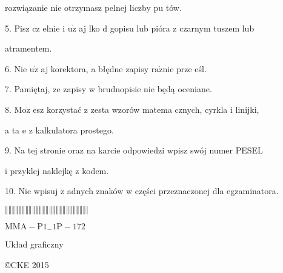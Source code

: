 \documentclass[a4paper,12pt]{article}
\begin{document}
rozwiązanie nie otrzymasz pelnej liczby pu tów.

5. Pisz cz elnie i $\mathrm{u}\dot{\mathrm{z}}$ aj lko $\mathrm{d}$ gopisu lub pióra z czarnym tuszem lub

atramentem.

6. Nie $\mathrm{u}\dot{\mathrm{z}}$ aj korektora, a błędne zapisy $\mathrm{r}\mathrm{a}\acute{\mathrm{z}}\mathrm{n}\mathrm{i}\mathrm{e}$ prze eśl.

7. Pamiętaj, $\dot{\mathrm{z}}\mathrm{e}$ zapisy w brudnopisie nie będą oceniane.

8. $\mathrm{M}\mathrm{o}\dot{\mathrm{z}}$ esz korzystać z zesta wzorów matema cznych, cyrkla i linijki,

a ta $\mathrm{e}$ z kalkulatora prostego.

9. Na tej stronie oraz na karcie odpowiedzi wpisz swój numer PESEL

i przyklej naklejkę z kodem.

10. Nie wpisuj $\dot{\mathrm{z}}$ adnych znaków w części przeznaczonej dla egzaminatora.

$\Vert\Vert\Vert\Vert\Vert\Vert\Vert\Vert\Vert\Vert\Vert\Vert\Vert\Vert\Vert\Vert\Vert\Vert\Vert\Vert\Vert\Vert\Vert\Vert|$

$\mathrm{M}\mathrm{M}\mathrm{A}-\mathrm{P}1_{-}1\mathrm{P}-172$

Układ graficzny

\copyright CKE 2015
\end{document}
